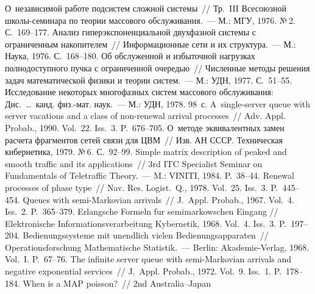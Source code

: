 \begin{multicols}{2}
{\small\frenchspacing
 {%
 \begin{thebibliography}{99}

 О~независимой работе подсистем сложной системы~// Тр.~III 
Всесоюзной  
шко\-лы-се\-ми\-на\-ра по теории массового обслуживания.~--- 
М.: МГУ, 1976. №\,2. С.~169--177.
 Анализ гиперэкспоненциальной двухфазной системы с 
ограниченным накопителем~// Информационные сети и их структура.~--- М.: Наука, 
1976.  
С.~168--180.
 Об обслуженной и избыточной нагрузках полнодоступного пучка с 
ограниченной очередью~// Численные методы решения задач математической физики и 
теории систем.~--- М.: УДН, 1977. С.~51--55.
 Исследование некоторых многофазных систем массового 
обслуживания: Дис.\ \ldots\ канд. физ.-мат. наук.~--- М.: УДН, 1978.  98~с.
 A~single-server queue with server 
vacations and a class of non-renewal arrival processes~// Adv. Appl. Probab., 1990. 
Vol.~22. Iss.~3. P.~676--705.
 О~методе эквивалентных замен 
расчета фрагментов сетей связи для ЦВМ~// Изв. АН \mbox{СССР}. Техническая кибернетика, 1979. №\,6. С.~92--99.
 Simple matrix description of peaked and smooth traffic and 
its applications~// 3rd ITC Specialist Seminar on Fundamentals of Teletraffic Theory.~--- M.: 
VINITI, 1984. P.~38--44. 
 Renewal processes of phase type~// Nav. Res. Logist.~Q., 1978. 
Vol.~25. Iss.~3. P.~445--454.
 Queues with semi-Markovian arrivals~// J.~Appl. Probab., 1967. Vol.~4. Iss.~2.  
P.~365--379.
 Erlangsche Formeln f$\ddot{\mbox{u}}$r semimarkowschen Eingang // 
Elektronische Informationsverarbeitung Kybernetik, 1968. Vol.~4. Iss.~3. P.~197--204.
 Bedienungssysteme mit unendlich vielen Bedienungsapparaten~// 
Operationsforschung Mathematische Statistik.~--- Berlin: Akademie-Verlag, 1968. Vol.~I. 
P.~67--76.
 The infinite server queue with semi-Markovian arrivals and negative 
exponential services~// J.~Appl. Probab., 1972. Vol.~9. Iss.~1. P.~178--184.
 When is a MAP poisson?~// 2nd Australia--Japan 

\end{thebibliography}}}
\end{multicols}
